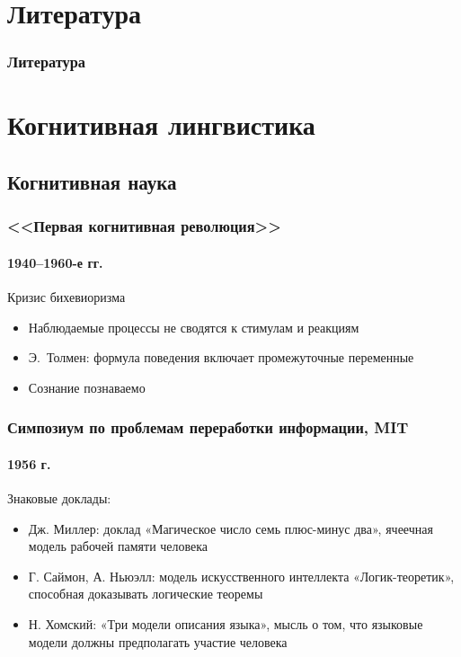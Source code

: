 % 

\frame{\titlepage}

\section{Литература}
\frame{\tableofcontents[currentsection]}

\begin{frame}
  \frametitle{Литература}
  \nocite{*}
  \printbibliography
\end{frame}

\section{Когнитивная лингвистика}

\subsection{Когнитивная наука}

\begin{frame}
  \frametitle{<<Первая когнитивная революция>>}
  \framesubtitle{1940--1960-е гг.}

  \begin{block}{Кризис бихевиоризма}
    \begin{itemize}
      \item Наблюдаемые процессы не сводятся к стимулам и реакциям
      \item Э.~Толмен: формула поведения включает промежуточные переменные
      \item Сознание познаваемо
    \end{itemize}
  \end{block}
\end{frame}

\begin{frame}
  \frametitle{Симпозиум по проблемам переработки информации, MIT}
  \framesubtitle{1956 г.}

  Знаковые доклады: \begin{itemize}
    \item Дж. Миллер: доклад «Магическое число семь плюс-минус два», ячеечная модель рабочей памяти человека
    \item Г. Саймон, А. Ньюэлл: модель искусственного интеллекта «Логик-теоретик», способная доказывать логические теоремы
    \item Н. Хомский: «Три модели описания языка», мысль о том, что языковые модели должны предполагать участие человека
  \end{itemize}
\end{frame}

